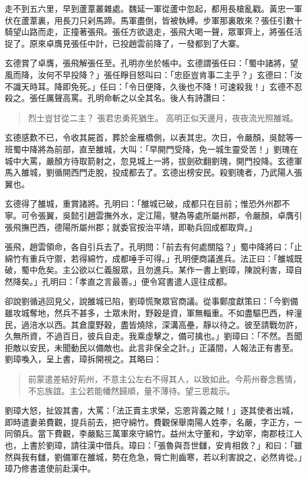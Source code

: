 走不到五六里，早到蘆葦叢雜處。魏延一軍從蘆中忽起，都用長槍亂戳。黃忠一軍伏在蘆葦裏，用長刀只剁馬蹄。馬軍盡倒，皆被執縛。步軍那裏敢來？張任引數十騎望山路而走，正撞著張飛。張任方欲退走，張飛大喝一聲，眾軍齊上，將張任活捉了。原來卓膺見張任中計，已投趙雲前降了，一發都到了大寨。

玄德賞了卓膺，張飛解張任至。孔明亦坐於帳中。玄德謂張任曰：「蜀中諸將，望風而降，汝何不早投降？」張任睜目怒叫曰：「忠臣豈肯事二主乎？」玄德曰：「汝不識天時耳。降即免死。」任曰：「令日便降，久後也不降！可速殺我！」玄德不忍殺之。張任厲聲高罵。孔明命斬之以全其名。後人有詩讚曰：

\begin{quote}
烈士豈甘從二主？
張君忠勇死猶生。
高明正似天邊月，夜夜流光照雒城。
\end{quote}

玄德感歎不已，令收其屍首，葬於金雁橋側，以表其忠。次日，令嚴顏，吳懿等一班蜀中降將為前部，直至雒城，大叫：「早開門受降，免一城生靈受苦！」劉瑰在城中大罵，嚴顏方待取箭射之，忽見城上一將，拔劍砍翻劉瑰，開門投降。玄德軍馬入雒城，劉循開西門走脫，投成都去了。玄德出榜安民。殺劉瑰者，乃武陽人張翼也。

玄德得了雒城，重賞諸將。孔明曰：「雒城已破，成都只在目前；惟恐外州郡不寧。可令張翼，吳懿引趙雲撫外水，定江陽，犍為等處所屬州郡，令嚴顏，卓膺引張飛撫巴西，德陽所屬州郡；就委官按治平靖，即勒兵回成都取齊。」

張飛，趙雲領命，各自引兵去了。孔明問：「前去有何處關隘？」蜀中降將曰：「止綿竹有重兵守禦，若得綿竹，成都唾手可得。」孔明便商議進兵。法正曰：「雒城既破，蜀中危矣。主公欲以仁義服眾，且勿進兵。某作一書上劉璋，陳說利害，璋自然降矣。」孔明曰：「孝直之言最善。」便令寫書遣人逕往成都。

卻說劉循逃回見父，說雒城已陷，劉璋慌聚眾官商議。從事鄭度獻策曰：「今劉備雖攻城奪地，然兵不甚多，士眾未附，野穀是資，軍無輜重。不如盡驅巴西，梓潼民，過涪水以西。其倉廩野穀，盡皆燒除，深溝高壘，靜以待之。彼至請戰勿許，久無所資，不過百日，彼兵自走。我乘虛擊之，備可擒也。」劉璋曰：「不然。吾聞拒敵以安民，未聞動民以備敵也。此言非保全之計。」正議間，人報法正有書至。劉璋喚入，呈上書，璋拆開視之。其略曰：

\begin{quote}
前蒙遣差結好荊州，不意主公左右不得其人，以致如此。今荊州眷念舊情，不忘族誼。主公若能幡然歸順，量不薄待。望三思裁示。
\end{quote}

劉璋大怒，扯毀其書，大罵：「法正賣主求榮，忘恩背義之賊！」逐其使者出城，即時遣妻弟費觀，提兵前去，把守綿竹。費觀保舉南陽人姓李，名嚴，字正方，一同領兵。當下費觀，李嚴點三萬軍來守綿竹。益州太守董和，字幼宰，南郡枝江人也，上書於劉璋，請往漢中借兵。璋曰：「張魯與吾世讎，安肯相救？」和曰：「雖然與我有讎，劉備軍在雒城，勢在危急，脣亡則齒寒，若以利害說之，必然肯從。」璋乃修書遣使前赴漢中。


